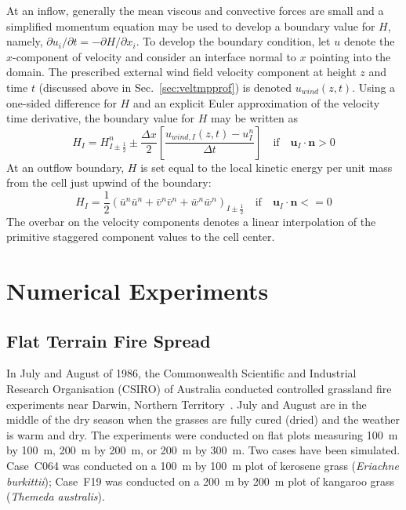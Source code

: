 \documentclass[journal,article,atmosphere,submit,moreauthors,pdftex]{Definitions_Review_Process/mdpi}
\begin{document}
At an inflow, generally the mean viscous and convective forces are small and a simplified momentum equation   may be used to develop a boundary value for $H$, namely, $\partial u_i/\partial t = -\partial H/\partial x_i$. To develop the boundary condition, let $u$ denote the $x$-component of velocity and consider an interface normal to $x$ pointing into the domain.  The prescribed external wind field velocity component at height $z$ and time $t$ (discussed above in Sec.~\ref{sec:veltmpprof}) is denoted $u_{wind}(z,t)$.  Using a one-sided difference for $H$ and an explicit Euler approximation of the velocity time derivative, the boundary value for $H$ may be written as 
\begin{equation}
\label{eq:Hin}
H_I = H_{I\pm\frac{1}{2}}^n \pm \frac{\Delta x}{2}\left[\frac{u_{wind,I}(z,t) - u_I^n}{\Delta t}\right] \quad \mbox{if} \quad \mathbf{u}_I\cdot\mathbf{n}>0
\end{equation}
At an outflow boundary, $H$ is set equal to the local kinetic energy per unit mass from the cell just upwind of the boundary:
\begin{equation}
\label{eq:Hout}
H_I = \frac{1}{2}(\bar{u}^n \bar{u}^n + \bar{v}^n \bar{v}^n + \bar{w}^n \bar{w}^n)_{I\pm\frac{1}{2}} \quad \mbox{if} \quad \mathbf{u}_I\cdot\mathbf{n}<=0
\end{equation}
The overbar on the velocity components denotes a linear interpolation of the primitive staggered component values to the cell center.

\section{Numerical Experiments} \label{sec:numexp}


\subsection{Flat Terrain Fire Spread}  \label{sec:simexp}

In July and August of 1986, the Commonwealth Scientific and Industrial Research Organisation (CSIRO) of Australia conducted controlled grassland fire experiments near Darwin, Northern Territory~\cite{Cheney:IJWF1993}. July and August are in the middle of the dry season when the grasses are fully cured (dried) and the weather is warm and dry. The experiments were conducted on flat plots measuring 100~m by 100~m, 200~m by 200~m, or 200~m by 300~m. Two cases have been simulated. Case~C064 was conducted on a 100~m by 100~m plot of kerosene grass ({\it Eriachne burkittii}); Case~F19 was conducted on a 200~m by 200~m plot of kangaroo grass ({\it Themeda australis}).
\end{document}
